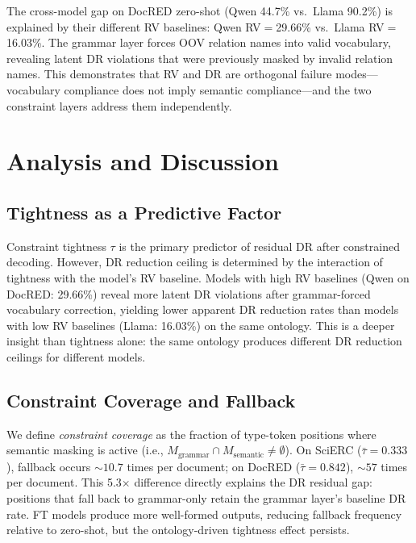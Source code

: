 \documentclass[11pt,a4paper]{article}
\begin{document}
The cross-model gap on DocRED zero-shot (Qwen 44.7\% vs.\ Llama 90.2\%) is explained by their different RV baselines: Qwen RV$=$29.66\% vs.\ Llama RV$=$16.03\%.
The grammar layer forces OOV relation names into valid vocabulary, revealing latent DR violations that were previously masked by invalid relation names.
This demonstrates that RV and DR are orthogonal failure modes---vocabulary compliance does not imply semantic compliance---and the two constraint layers address them independently.

\section{Analysis and Discussion}
\label{sec:analysis}

\subsection{Tightness as a Predictive Factor}

Constraint tightness $\tau$ is the primary predictor of residual DR after constrained decoding.
However, DR reduction ceiling is determined by the interaction of tightness with the model's RV baseline.
Models with high RV baselines (Qwen on DocRED: 29.66\%) reveal more latent DR violations after grammar-forced vocabulary correction, yielding lower apparent DR reduction rates than models with low RV baselines (Llama: 16.03\%) on the same ontology.
This is a deeper insight than tightness alone: the same ontology produces different DR reduction ceilings for different models.

\subsection{Constraint Coverage and Fallback}

We define \emph{constraint coverage} as the fraction of type-token positions where semantic masking is active (i.e., $M_{\text{grammar}} \cap M_{\text{semantic}} \neq \emptyset$).
On SciERC ($\bar{\tau}=0.333$), fallback occurs ${\sim}10.7$ times per document; on DocRED ($\bar{\tau}=0.842$), ${\sim}57$ times per document.
This 5.3$\times$ difference directly explains the DR residual gap: positions that fall back to grammar-only retain the grammar layer's baseline DR rate.
FT models produce more well-formed outputs, reducing fallback frequency relative to zero-shot, but the ontology-driven tightness effect persists.
\end{document}

